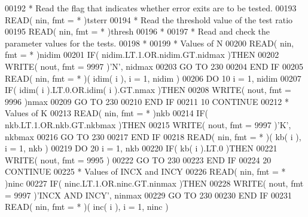 \begin{DoxyCode}
00192 \textcolor{comment}{*     Read the flag that indicates whether error exits are to be tested.}
00193       \textcolor{keyword}{READ}( nin, fmt = * )tsterr
00194 \textcolor{comment}{*     Read the threshold value of the test ratio}
00195       \textcolor{keyword}{READ}( nin, fmt = * )thresh
00196 \textcolor{comment}{*}
00197 \textcolor{comment}{*     Read and check the parameter values for the tests.}
00198 \textcolor{comment}{*}
00199 \textcolor{comment}{*     Values of N}
00200       \textcolor{keyword}{READ}( nin, fmt = * )nidim
00201       \textcolor{keywordflow}{IF}( nidim.LT.1.OR.nidim.GT.nidmax )\textcolor{keywordflow}{THEN}
00202          \textcolor{keyword}{WRITE}( nout, fmt = 9997 )\textcolor{stringliteral}{'N'}, nidmax
00203          \textcolor{keywordflow}{GO TO} 230
00204 \textcolor{keywordflow}{      END IF}
00205       \textcolor{keyword}{READ}( nin, fmt = * )( idim( i ), i = 1, nidim )
00206       \textcolor{keywordflow}{DO} 10 i = 1, nidim
00207          \textcolor{keywordflow}{IF}( idim( i ).LT.0.OR.idim( i ).GT.nmax )\textcolor{keywordflow}{THEN}
00208             \textcolor{keyword}{WRITE}( nout, fmt = 9996 )nmax
00209             \textcolor{keywordflow}{GO TO} 230
00210 \textcolor{keywordflow}{         END IF}
00211    10 \textcolor{keywordflow}{CONTINUE}
00212 \textcolor{comment}{*     Values of K}
00213       \textcolor{keyword}{READ}( nin, fmt = * )nkb
00214       \textcolor{keywordflow}{IF}( nkb.LT.1.OR.nkb.GT.nkbmax )\textcolor{keywordflow}{THEN}
00215          \textcolor{keyword}{WRITE}( nout, fmt = 9997 )\textcolor{stringliteral}{'K'}, nkbmax
00216          \textcolor{keywordflow}{GO TO} 230
00217 \textcolor{keywordflow}{      END IF}
00218       \textcolor{keyword}{READ}( nin, fmt = * )( kb( i ), i = 1, nkb )
00219       \textcolor{keywordflow}{DO} 20 i = 1, nkb
00220          \textcolor{keywordflow}{IF}( kb( i ).LT.0 )\textcolor{keywordflow}{THEN}
00221             \textcolor{keyword}{WRITE}( nout, fmt = 9995 )
00222             \textcolor{keywordflow}{GO TO} 230
00223 \textcolor{keywordflow}{         END IF}
00224    20 \textcolor{keywordflow}{CONTINUE}
00225 \textcolor{comment}{*     Values of INCX and INCY}
00226       \textcolor{keyword}{READ}( nin, fmt = * )ninc
00227       \textcolor{keywordflow}{IF}( ninc.LT.1.OR.ninc.GT.ninmax )\textcolor{keywordflow}{THEN}
00228          \textcolor{keyword}{WRITE}( nout, fmt = 9997 )\textcolor{stringliteral}{'INCX AND INCY'}, ninmax
00229          \textcolor{keywordflow}{GO TO} 230
00230 \textcolor{keywordflow}{      END IF}
00231       \textcolor{keyword}{READ}( nin, fmt = * )( inc( i ), i = 1, ninc )

\end{DoxyCode}
